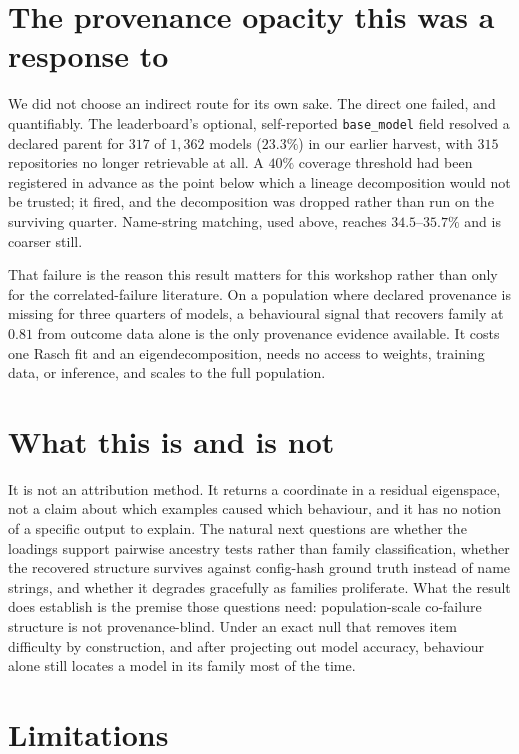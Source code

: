 \documentclass{article}
\begin{document}
\section{The provenance opacity this was a response to}
\label{sec:opacity}

We did not choose an indirect route for its own sake. The direct one failed, and quantifiably. The
leaderboard's optional, self-reported \texttt{base\_model} field resolved a declared parent for
$317$ of $1{,}362$ models ($23.3\%$) in our earlier harvest, with $315$ repositories no longer
retrievable at all. A $40\%$ coverage threshold had been registered in advance as the point below
which a lineage decomposition would not be trusted; it fired, and the decomposition was dropped
rather than run on the surviving quarter. Name-string matching, used above, reaches $34.5$--$35.7\%$
and is coarser still.

That failure is the reason this result matters for this workshop rather than only for the
correlated-failure literature. On a population where declared provenance is missing for three
quarters of models, a behavioural signal that recovers family at $0.81$ from outcome data alone is
the only provenance evidence available. It costs one Rasch fit and an eigendecomposition, needs no
access to weights, training data, or inference, and scales to the full population.

\section{What this is and is not}

It is not an attribution method. It returns a coordinate in a residual eigenspace, not a claim
about which examples caused which behaviour, and it has no notion of a specific output to explain.
The natural next questions are whether the loadings support pairwise ancestry tests rather than
family classification, whether the recovered structure survives against config-hash ground truth
instead of name strings, and whether it degrades gracefully as families proliferate. What the
result does establish is the premise those questions need: population-scale co-failure structure is
not provenance-blind. Under an exact null that removes item difficulty by construction, and after
projecting out model accuracy, behaviour alone still locates a model in its family most of the time.

\section{Limitations}
\end{document}
